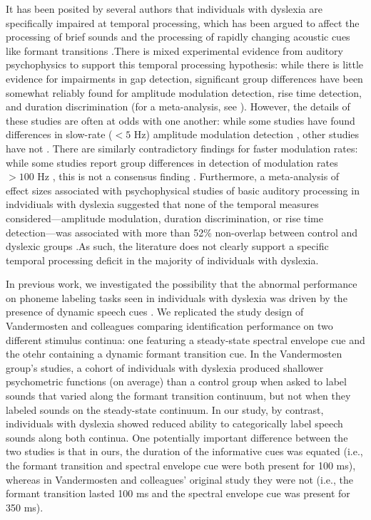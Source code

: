 \documentclass[../uwthesis.tex]{subfiles}
\begin{document}
It has been posited by several authors that individuals with dyslexia are specifically impaired at temporal processing, which has been argued to affect the processing of brief sounds \cite{Gaab2007,Lehongre2011,Richardson2004,Tallal1980} and the processing of rapidly changing acoustic cues like formant transitions \cite{Vandermosten2010,Vandermosten2011}.There is mixed experimental evidence from auditory psychophysics to support this temporal processing hypothesis: while there is little evidence for impairments in gap detection, significant group differences have been somewhat reliably found for amplitude modulation detection, rise time detection, and duration discrimination (for a meta-analysis, see \cite{Hamalainen2013}). However, the details of these studies are often at odds with one another: while some studies have found differences in slow-rate ($<5$ Hz) amplitude modulation detection \cite{Rocheron2002,Stuart2006}, other studies have not \cite{Amitay2002,Rocheron2002,Witton2002}. There are similarly contradictory findings for faster modulation rates: while some studies report group differences in detection of modulation rates $>100$ Hz \cite{Lorenzi2000, Menell1999, Rocheron2002}, this is not a consensus finding \cite{Amitay2002D,Stuart2006}. Furthermore, a meta-analysis of effect sizes associated with psychophysical studies of basic auditory processing in indvidiuals with dyslexia suggested that none of the temporal measures considered---amplitude modulation, duration discrimination, or rise time detection---was associated with more than 52\% non-overlap between control and dyslexic groups \cite{Hamalainen2013}.As such, the literature does not clearly support a specific temporal processing deficit in the majority of individuals with dyslexia.

In previous work, we investigated the possibility that the abnormal performance on phoneme labeling tasks seen in individuals with dyslexia was driven by the presence of dynamic speech cues \cite{OBrien2018}. We replicated the study design of Vandermosten and colleagues \cite{Vandermosten2010,Vandermosten2011} comparing identification performance on two different stimulus continua: one featuring a steady-state spectral envelope cue and the otehr containing a dynamic formant transition cue. In the Vandermosten group's studies, a cohort of individuals with dyslexia produced shallower psychometric functions (on average) than a control group when asked to label sounds that varied along the formant transition continuum, but not when they labeled sounds on the steady-state continuum. In our study, by contrast, individuals with dyslexia showed reduced ability to categorically label speech sounds along both continua. One potentially important difference between the two studies is that in ours, the duration of the informative cues was equated (i.e., the formant transition and spectral envelope cue were both present for 100 ms), whereas in Vandermosten and colleagues' original study they were not (i.e., the formant transition lasted 100 ms and the spectral envelope cue was present for 350 ms).
\end{document}
